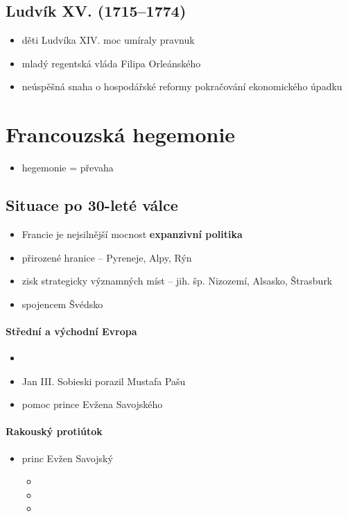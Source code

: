 \subsection{Ludvík XV. (1715--1774)}
\begin{itemize}
\item děti Ludvíka XIV. moc umíraly \ra pravnuk
\item mladý \ra regentská vláda Filipa Orleánského
\item neúspěšná snaha o hospodářské reformy \ra pokračování ekonomického úpadku
\end{itemize}




\section{Francouzská hegemonie}
\begin{itemize}
\item hegemonie = převaha
\end{itemize}
\subsection{Situace po 30-leté válce}
\begin{itemize}
\item Francie je nejsilnější mocnost \ra \textbf{expanzivní politika}
\item přirozené hranice -- Pyreneje, Alpy, Rýn
\item zisk strategicky významných míst -- jih. šp. Nizozemí, Alsasko, Štrasburk
\item spojencem Švédsko
\end{itemize}

\paragraph{Střední a východní Evropa}
\begin{itemize}
\item {}
\item Jan III. Sobieski porazil Mustafa Pašu
\item pomoc prince Evžena Savojského
\end{itemize}

\paragraph{Rakouský protiútok}
\begin{itemize}
\item princ Evžen Savojský
	\begin{itemize}
	\item {}
	\item {}
	\item {}
	\end{itemize}
\end{itemize}

